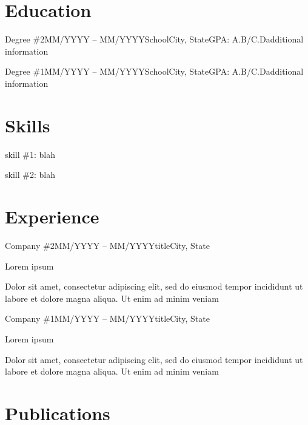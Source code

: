 \documentclass{resume}
\author{First Last}
\begin{document}
\maketitle
\section{Education}
\begin{edhistory}{Degree \#2}{MM/YYYY -- MM/YYYY}{School}{City, State}{GPA: A.B/C.D}{\small additional information}
\end{edhistory}
\begin{edhistory}{Degree \#1}{MM/YYYY -- MM/YYYY}{School}{City, State}{GPA: A.B/C.D}{\small additional information}
\end{edhistory}
\section{Skills}
\begin{cvlist}
    \item skill \#1: blah
    \item skill \#2: blah
\end{cvlist}
\section{Experience}
\begin{cventry}{Company \#2}{MM/YYYY -- MM/YYYY}{title}{City, State}
    \item Lorem ipsum
    \item Dolor sit amet, consectetur adipiscing elit, sed do eiusmod tempor incididunt ut labore et dolore magna aliqua. Ut enim ad minim veniam
\end{cventry}
\begin{cventry}{Company \#1}{MM/YYYY -- MM/YYYY}{title}{City, State}
    \item Lorem ipsum
    \item Dolor sit amet, consectetur adipiscing elit, sed do eiusmod tempor incididunt ut labore et dolore magna aliqua. Ut enim ad minim veniam
\end{cventry}
\section{Publications}
    \nocite{*}
\end{document}
